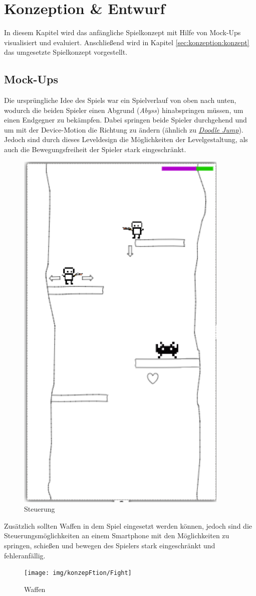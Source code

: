 \chapter{Konzeption \& Entwurf}
\label{cha:konzeption}
In diesem Kapitel wird das anfängliche Spielkonzept mit Hilfe von Mock-Ups visualisiert und evaluiert. Anschließend wird in Kapitel \ref{sec:konzeption:konzept} das umgesetzte Spielkonzept vorgestellt.

\section{Mock-Ups}
\label{sec:konzeption:prototyping:mockups}
Die ursprüngliche Idee des Spiels war ein Spielverlauf von oben nach unten, wodurch die beiden Spieler einen Abgrund (\textit{Abyss}) hinabspringen müssen, um einen Endgegner zu bekämpfen. Dabei springen beide Spieler durchgehend und um mit der Device-Motion die Richtung zu ändern (ähnlich zu \href{https://play.google.com/store/apps/details?id=com.lima.doodlejump&hl=de}{\textit{Doodle Jump}}). Jedoch sind durch dieses Leveldesign die Möglichkeiten der Levelgestaltung, als auch die Bewegungsfreiheit der Spieler stark eingeschränkt.
\begin{figure}[H]
    \begin{center}
      \includegraphics[width=.22\linewidth]{img/konzeption/Jump}
      \caption{Steuerung}
      \label{fig:konzeption:prototyping:jump}
    \end{center}
\end{figure}


Zusätzlich sollten Waffen in dem Spiel eingesetzt werden können, jedoch sind die Steuerungsmöglichkeiten an einem Smartphone mit den Möglichkeiten zu springen, schießen und bewegen des Spielers stark eingeschränkt und fehleranfällig.

\begin{figure}[H]
    \begin{center}
      \texttt{[image: img/konzepFtion/Fight]}
      \caption{Waffen}
      \label{fig:konzeption:prototyping:fight}
    \end{center}
\end{figure}


